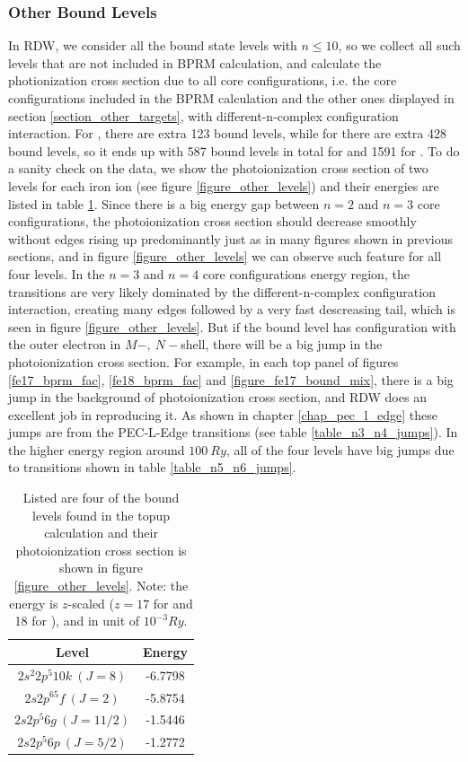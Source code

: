 \subsubsection{Other Bound Levels}
In RDW, we consider all the bound state levels with $n\leq10$, so we collect all such levels that are not included in BPRM calculation, and calculate the photionization cross section due to all core configurations, i.e. the core configurations included in the BPRM calculation and the other ones displayed in section \ref{section_other_targets}, with different-n-complex configuration interaction. For , there are extra 123 bound levels, while for  there are extra 428 bound levels, so it ends up with 587 bound levels in total for  and 1591 for . To do a sanity check on the data, we show the photoionization cross section of two levels for each iron ion (see figure \ref{figure_other_levels}) and their energies are listed in table \ref{table_other_levels}. Since there is a big energy gap between $n=2$ and $n=3$ core configurations, the photoionization cross section should decrease smoothly without edges rising up predominantly just as in many figures shown in previous sections, and in figure \ref{figure_other_levels} we can observe such feature for all four levels. In the $n=3$ and $n=4$ core configurations energy region, the transitions are very likely dominated by the different-n-complex configuration interaction, creating many edges followed by a very fast descreasing tail, which is seen in figure \ref{figure_other_levels}. But if the bound level has configuration with the outer electron in $M-,~N-$shell, there will be a big jump in the photoionization cross section. For example, in each top panel of figures \ref{fe17_bprm_fac}, \ref{fe18_bprm_fac} and \ref{figure_fe17_bound_mix}, there is a big jump in the background of photoionization cross section, and RDW does an excellent job in reproducing it. As shown in chapter \ref{chap_pec_l_edge} these jumps are from the  PEC-L-Edge transitions (see table \ref{table_n3_n4_jumps}). In the higher energy region around $100~Ry$, all of the four levels have big jumps due to transitions shown in table \ref{table_n5_n6_jumps}. 

\begin{table}
	\centering
	\caption{Listed are four of the bound levels found in the topup calculation and their photoionization cross section is shown in figure \ref{figure_other_levels}. Note: the energy is $z$-scaled ($z=17$ for  and 18 for ), and in unit of $10^{-3} Ry$.}
	\begin{tabular} { | c | c |}
		\hline
		Level & Energy \\
		\hline
		$2s^2 2p^5 10k~(J=8)$ & -6.7798\\
		$2s 2p^65f ~(J=2)$ & -5.8754\\
		$2s 2p^5 6g~(J=11/2)$ & -1.5446\\
		$2s 2p^5 6p~(J=5/2)$ & -1.2772\\
		\hline	  								   
	\end{tabular}
	\label{table_other_levels}
\end{table}

